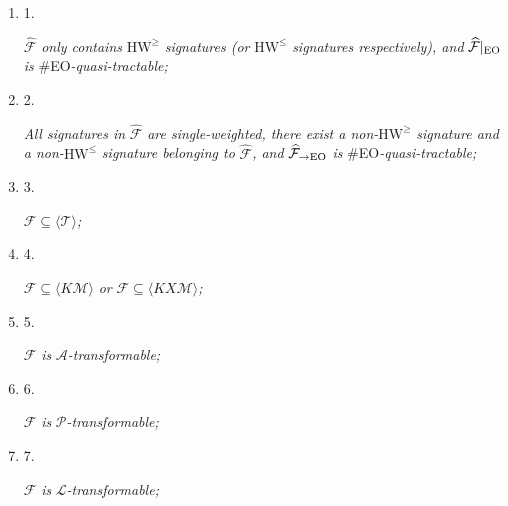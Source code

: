 \begin{enumerate}


\item[] 
1. 


$\widehat{\mathcal{F}}$\emph{ only contains }$\text{HW}^{\geq}$\emph{ signatures (or }$\text{HW}^{\leq}$\emph{ signatures respectively), and }$\widehat{\mathcal{F}}|_{\textup{{EO}}}$\emph{ is }\#EO\emph{-quasi-tractable;}\par





\item[] 
2. 


\emph{All signatures in }$\widehat{\mathcal{F}}$\emph{ are single-weighted, there exist a non-}$\text{HW}^{\geq}$\emph{ signature and a non-}$\text{HW}^{\leq}$\emph{ signature belonging to }$\widehat{\mathcal{F}}$\emph{, and }$\widehat{\mathcal{F}}_{\to\textup{{EO}}}$\emph{ is }\#EO\emph{-quasi-tractable;}\par





\item[] 
3. 


$\mathcal{F}\subseteq\langle\mathcal{T}\rangle$\emph{;}\par





\item[] 
4. 


$\mathcal{F}\subseteq\langle K\mathcal{M}\rangle$\emph{ or }$\mathcal{F}\subseteq\langle KX\mathcal{M}\rangle$\emph{;}\par





\item[] 
5. 


$\mathcal{F}$\emph{ is }$\mathscr{A}$\emph{-transformable;}\par





\item[] 
6. 


$\mathcal{F}$\emph{ is }$\mathscr{P}$\emph{-transformable;}\par





\item[] 
7. 


$\mathcal{F}$\emph{ is }$\mathscr{L}$\emph{-transformable;}\par





\end{enumerate}


